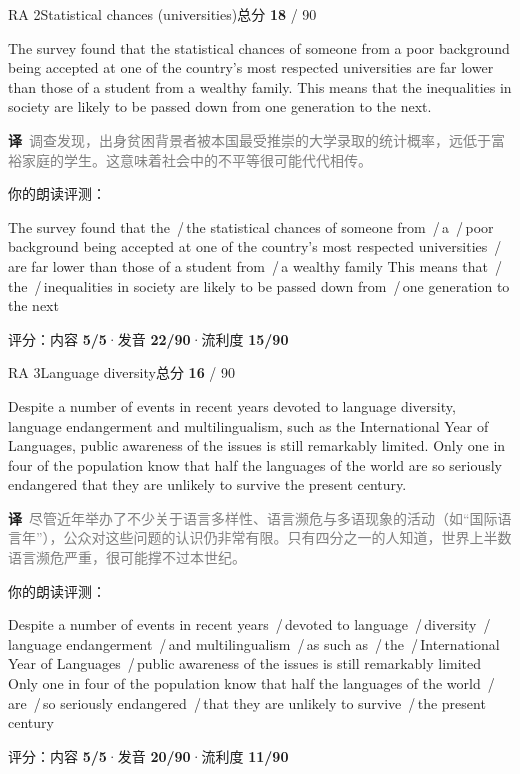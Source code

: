 \documentclass[11pt]{article}
\newcommand{\sfull}[1]{\textcolor{cFix}{\bfseries #1}}     %
\newcommand{\spart}[1]{\textcolor{cPartial}{\bfseries #1}} %
\newcommand{\szero}[1]{\textcolor{cWrong}{\bfseries #1}}   %
\newcommand{\sg}[1]{\textcolor{cSpkGood}{#1}}   %
\newcommand{\sy}[1]{\textcolor{cSpkOk}{#1}}     %
\newcommand{\sr}[1]{\textcolor{cSpkBad}{#1}}    %
\newcommand{\pse}{{\color{gray}\,/\,}}          %
\newcommand{\zh}[1]{{\footnotesize\textcolor{cNote}{\textbf{译}}\ \textcolor{gray}{#1}}}
\begin{document}
\begin{qblock}{RA 2\quad Statistical chances (universities)}{总分 \textcolor{cAccent}{\bfseries 18} / 90}
\begin{promptbox}
The survey found that the statistical chances of someone from a poor background being accepted at one of the country's most respected universities are far lower than those of a student from a wealthy family. This means that the inequalities in society are likely to be passed down from one generation to the next.
\end{promptbox}
\zh{调查发现，出身贫困背景者被本国最受推崇的大学录取的统计概率，远低于富裕家庭的学生。这意味着社会中的不平等很可能代代相传。}
\smallskip\par{\footnotesize\color{gray}你的朗读评测：}
\begin{asrbox}
\sg{The survey found that the} \pse \sg{the} \sr{statistical chances} \sg{of someone from} \pse \sy{a} \pse \sy{poor} \sg{background being} \sy{accepted at} \sg{one of the country's most respected universities} \pse \sy{are far} \sg{lower than those of} \sg{a student from} \pse \sg{a wealthy family This means that} \pse \sy{the} \pse \sy{inequalities in society} \sg{are likely to be passed down from} \pse \sg{one generation to the next}
\end{asrbox}
{\small 评分：内容 \sfull{5/5}\quad·\quad 发音 \spart{22/90}\quad·\quad 流利度 \szero{15/90}}
\end{qblock}

\begin{qblock}{RA 3\quad Language diversity}{总分 \textcolor{cAccent}{\bfseries 16} / 90}
\begin{promptbox}
Despite a number of events in recent years devoted to language diversity, language endangerment and multilingualism, such as the International Year of Languages, public awareness of the issues is still remarkably limited. Only one in four of the population know that half the languages of the world are so seriously endangered that they are unlikely to survive the present century.
\end{promptbox}
\zh{尽管近年举办了不少关于语言多样性、语言濒危与多语现象的活动（如“国际语言年”），公众对这些问题的认识仍非常有限。只有四分之一的人知道，世界上半数语言濒危严重，很可能撑不过本世纪。}
\smallskip\par{\footnotesize\color{gray}你的朗读评测：}
\begin{asrbox}
\sy{Despite a number of events in recent years} \pse \sg{devoted to language} \pse \sy{diversity} \pse \sg{language endangerment} \pse \sy{and multilingualism} \pse \sy{as such as} \pse \sy{the} \pse \sy{International Year of Languages} \pse \sg{public awareness of the issues is still remarkably limited} \sg{Only one in four of the} \sr{population} \sg{know that half the languages of the world} \pse \sy{are} \pse \sy{so seriously endangered} \pse \sg{that they are unlikely to survive} \pse \sy{the present century}
\end{asrbox}
{\small 评分：内容 \sfull{5/5}\quad·\quad 发音 \spart{20/90}\quad·\quad 流利度 \szero{11/90}}
\end{qblock}
\end{document}
